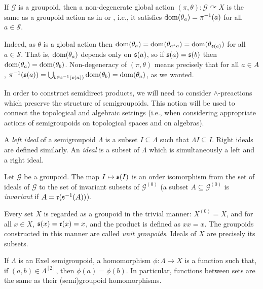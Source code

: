 \begin{example}\label{ex:groupoidnondegenerateaction}
	If $\mathcal{G}$ is a groupoid, then a non-degenerate global action $(\pi,\theta)\colon\mathcal{G}\curvearrowright X$ is the same as a groupoid action as in \cite[Definition 3.6]{MR2969047} or \cite[Exercise 11.2.1]{MR2273730}, i.e., it satisfies $\operatorname{dom}(\theta_a)=\pi^{-1}(a)$ for all $a\in\mathcal{S}$.
	
	Indeed, as $\theta$ is a global action then $\operatorname{dom}(\theta_a)=\operatorname{dom}(\theta_{a^*a})=\operatorname{dom}(\theta_{\operatorname{\mathfrak{s}}(a)})$ for all $a\in\mathcal{S}$. That is, $\operatorname{dom}(\theta_a)$ depends only on $\operatorname{\mathfrak{s}}(a)$, so if $\operatorname{\mathfrak{s}}(a)=\operatorname{\mathfrak{s}}(b)$ then $\operatorname{dom}(\theta_a)=\operatorname{dom}(\theta_b)$. Non-degeneracy of $(\pi,\theta)$ means precisely that for all $a\in A$, $\pi^{-1}(\operatorname{\mathfrak{s}}(a))=\bigcup_{b\in\operatorname{\mathfrak{s}}^{-1}(\operatorname{\mathfrak{s}}(a))}\operatorname{dom}(\theta_b)=\operatorname{dom}(\theta_a)$, as we wanted.
\end{example}

In order to construct semidirect products, we will need to consider $\land$-preactions which preserve the structure of semigroupoids. This notion will be used to connect the topological and algebraic settings (i.e., when considering appropriate actions of semigroupoids on topological spaces and on algebras).

\begin{definition}
A \emph{left ideal} of a semigroupoid $\Lambda$ is a subset $I\subseteq\Lambda$ such that $\Lambda I\subseteq I$. Right ideals are defined similarly. An \emph{ideal} is a subset of $\Lambda$ which is simultaneously a left and a right ideal.
\end{definition}

\begin{example}
Let $\mathcal{G}$ be a groupoid. The map $I\mapsto\operatorname{\mathfrak{s}}(I)$ is an order isomorphism from the set of ideals of $\mathcal{G}$ to the set of invariant subsets of $\mathcal{G}^{(0)}$ (a subset $A\subseteq\mathcal{G}^{(0)}$ is \emph{invariant} if $A=\operatorname{\mathfrak{r}}(\operatorname{\mathfrak{s}}^{-1}(A))$).
\end{example}

Every set $X$ is regarded as a groupoid in the trivial manner: $X^{(0)}=X$, and for all $x\in X$, $\operatorname{\mathfrak{s}}(x)=\operatorname{\mathfrak{r}}(x)=x$, and the product is defined as $xx=x$. The groupoids constructed in this manner are called \emph{unit groupoids}. Ideals of $X$ are precisely its subsets.

If $\Lambda$ is an Exel semigroupoid, a homomorphism $\phi\colon\Lambda\to X$ is a function such that, if $(a,b)\in\Lambda^{[2]}$, then $\phi(a)=\phi(b)$. In particular, functions between sets are the same as their (semi)groupoid homomorphisms.

